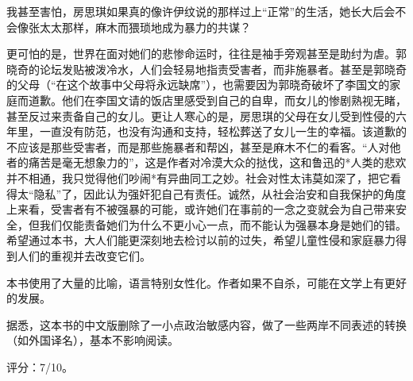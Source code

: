 我甚至害怕，房思琪如果真的像许伊纹说的那样过上“正常”的生活，她长大后会不会像张太太那样，麻木而猥琐地成为暴力的共谋？

更可怕的是，世界在面对她们的悲惨命运时，往往是袖手旁观甚至是助纣为虐。郭晓奇的论坛发贴被泼冷水，人们会轻易地指责受害者，而非施暴者。甚至是郭晓奇的父母（“在这个故事中父母将永远缺席”），也需要因为郭晓奇破坏了李国文的家庭而道歉。他们在李国文请的饭店里感受到自己的自卑，而女儿的惨剧熟视无睹，甚至反过来责备自己的女儿。更让人寒心的是，房思琪的父母在女儿受到性侵的六年里，一直没有防范，也没有沟通和支持，轻松葬送了女儿一生的幸福。该道歉的不应该是那些受害者，而是那些施暴者和帮凶，甚至是麻木不仁的看客。“人对他者的痛苦是毫无想象力的”，这是作者对冷漠大众的挞伐，这和鲁迅的*人类的悲欢并不相通，我只觉得他们吵闹*有异曲同工之妙。社会对性太讳莫如深了，把它看得太“隐私”了，因此认为强奸犯自己有责任。诚然，从社会治安和自我保护的角度上来看，受害者有不被强暴的可能，或许她们在事前的一念之变就会为自己带来安全，但我们仅能责备她们为什么不更小心一点，而不能认为强暴本身是她们的错。希望通过本书，大人们能更深刻地去检讨以前的过失，希望儿童性侵和家庭暴力得到人们的重视并去改变它们。

本书使用了大量的比喻，语言特别女性化。作者如果不自杀，可能在文学上有更好的发展。

据悉，这本书的中文版删除了一小点政治敏感内容，做了一些两岸不同表述的转换（如外国译名），基本不影响阅读。

评分：7/10。

